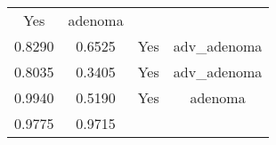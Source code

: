 \documentclass[12pt,]{article}
\begin{document}
\begin{longtable}[]{@{}cccc@{}}
\begin{minipage}[t]{0.22\columnwidth}
Yes\strut
\end{minipage} & \begin{minipage}[t]{0.16\columnwidth}\centering\strut
adenoma\strut
\end{minipage}\tabularnewline
\begin{minipage}[t]{0.24\columnwidth}\centering\strut
0.8290\strut
\end{minipage} & \begin{minipage}[t]{0.26\columnwidth}\centering\strut
0.6525\strut
\end{minipage} & \begin{minipage}[t]{0.22\columnwidth}\centering\strut
Yes\strut
\end{minipage} & \begin{minipage}[t]{0.16\columnwidth}\centering\strut
adv\_adenoma\strut
\end{minipage}\tabularnewline
\begin{minipage}[t]{0.24\columnwidth}\centering\strut
0.8035\strut
\end{minipage} & \begin{minipage}[t]{0.26\columnwidth}\centering\strut
0.3405\strut
\end{minipage} & \begin{minipage}[t]{0.22\columnwidth}\centering\strut
Yes\strut
\end{minipage} & \begin{minipage}[t]{0.16\columnwidth}\centering\strut
adv\_adenoma\strut
\end{minipage}\tabularnewline
\begin{minipage}[t]{0.24\columnwidth}\centering\strut
0.9940\strut
\end{minipage} & \begin{minipage}[t]{0.26\columnwidth}\centering\strut
0.5190\strut
\end{minipage} & \begin{minipage}[t]{0.22\columnwidth}\centering\strut
Yes\strut
\end{minipage} & \begin{minipage}[t]{0.16\columnwidth}\centering\strut
adenoma\strut
\end{minipage}\tabularnewline
\begin{minipage}[t]{0.24\columnwidth}\centering\strut
0.9775\strut
\end{minipage} & \begin{minipage}[t]{0.26\columnwidth}\centering\strut
0.9715\strut
\end{minipage} & \begin{minipage}[t]{0.22\columnwidth}\centering\strut

\end{minipage}
\end{longtable}
\end{document}
